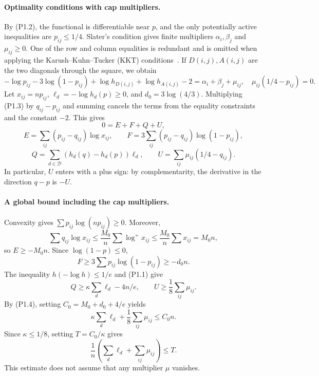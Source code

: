 \paragraph{Optimality conditions with cap multipliers.}
By (P1.2), the functional is differentiable near $p$, and the only potentially
active inequalities are $p_{ij}\le1/4$.
Slater's condition gives finite multipliers $\alpha_i,\beta_j$ and
$\mu_{ij}\ge0$. One of the row and column equalities is redundant and is omitted
when applying the Karush--Kuhn--Tucker (KKT) conditions~\cite[Ch.~5]{BV}. If $D(i,j),A(i,j)$ are the
two diagonals through the square, we obtain
\[
 -\log p_{ij}-3\log(1-p_{ij})+\log h_{D(i,j)}+\log h_{A(i,j)}-2
 =\alpha_i+\beta_j+\mu_{ij},\quad
 \mu_{ij}(1/4-p_{ij})=0.                          \tag{P1.3}
\]
Let $x_{ij}=np_{ij}$, $\ell_d=-\log h_d(p)\ge0$, and
$d_0=3\log(4/3)$. Multiplying (P1.3) by $q_{ij}-p_{ij}$ and
summing cancels the terms from the equality constraints and the constant $-2$. This gives
\[
 0=E+F+Q+U,                                      \tag{P1.4}
\]
\[
 E=\sum_{ij}(p_{ij}-q_{ij})\log x_{ij},\qquad
 F=3\sum_{ij}(p_{ij}-q_{ij})\log(1-p_{ij}),
\]
\[
 Q=\sum_{d\in\mathcal D}(h_d(q)-h_d(p))\ell_d,\qquad
 U=\sum_{ij}\mu_{ij}(1/4-q_{ij}).
\]
In particular, $U$ enters with a plus sign: by complementarity, the derivative in the direction $q-p$
is $-U$.

\paragraph{A global bound including the cap multipliers.}
Convexity gives $\sum p_{ij}\log(np_{ij})\ge0$. Moreover,
\[
 \sum q_{ij}\log x_{ij}\le\frac{M_0}{n}\sum\log^+x_{ij}
 \le\frac{M_0}{n}\sum x_{ij}=M_0n,
\]
so $E\ge-M_0n$. Since $\log(1-p)\le0$,
\[
 F\ge3\sum p_{ij}\log(1-p_{ij})\ge-d_0n.
\]
The inequality $h(-\log h)\le1/e$ and (P1.1) give
\[
 Q\ge\kappa\sum_d\ell_d-4n/e,\qquad
 U\ge\frac18\sum_{ij}\mu_{ij}.
\]
By (P1.4), setting $C_0=M_0+d_0+4/e$ yields
\[
 \kappa\sum_d\ell_d+\frac18\sum_{ij}\mu_{ij}\le C_0n.
\]
Since $\kappa\le1/8$, setting $T=C_0/\kappa$ gives
\[
 \frac1n\left(\sum_d\ell_d+\sum_{ij}\mu_{ij}\right)\le T.    \tag{P1.5}
\]
This estimate does not assume that any multiplier $\mu$ vanishes.
